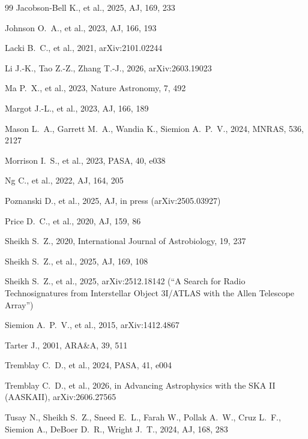 \documentclass{openjournal}
\begin{document}
\begin{thebibliography}{99}
 Jacobson-Bell K., et al., 2025, AJ, 169, 233

 Johnson O.~A., et al., 2023, AJ, 166, 193

 Lacki B.~C., et al., 2021, arXiv:2101.02244

 Li J.-K., Tao Z.-Z., Zhang T.-J., 2026, arXiv:2603.19023

 Ma P.~X., et al., 2023, Nature Astronomy, 7, 492

 Margot J.-L., et al., 2023, AJ, 166, 189

 Mason L.~A., Garrett M.~A., Wandia K., Siemion A.~P.~V., 2024, MNRAS, 536, 2127

 Morrison I.~S., et al., 2023, PASA, 40, e038

 Ng C., et al., 2022, AJ, 164, 205

 Poznanski D., et al., 2025, AJ, in press (arXiv:2505.03927)

 Price D.~C., et al., 2020, AJ, 159, 86

 Sheikh S.~Z., 2020, International Journal of Astrobiology, 19, 237

 Sheikh S.~Z., et al., 2025, AJ, 169, 108

 Sheikh S.~Z., et al., 2025, arXiv:2512.18142 (``A Search for Radio Technosignatures from Interstellar Object 3I/ATLAS with the Allen Telescope Array'')

 Siemion A.~P.~V., et al., 2015, arXiv:1412.4867

 Tarter J., 2001, ARA\&A, 39, 511

 Tremblay C.~D., et al., 2024, PASA, 41, e004

 Tremblay C.~D., et al., 2026, in Advancing Astrophysics with the SKA II (AASKAII), arXiv:2606.27565

 Tusay N., Sheikh S.~Z., Sneed E.~L., Farah W., Pollak A.~W., Cruz L.~F., Siemion A., DeBoer D.~R., Wright J.~T., 2024, AJ, 168, 283


\end{thebibliography}
\end{document}
